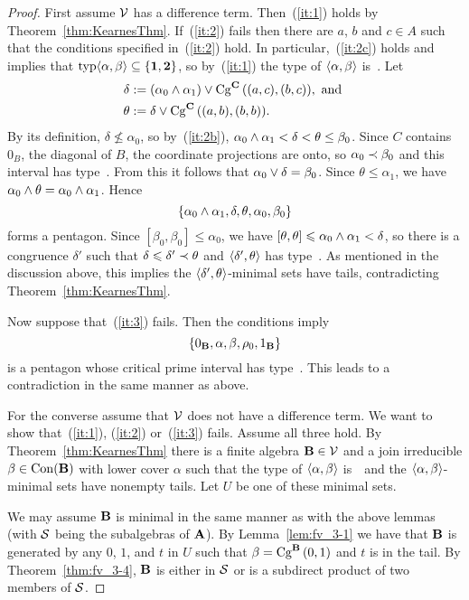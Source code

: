 \begin{proof}
First assume $\sV$ has a difference term.
Then~(\ref{it:1}) holds by Theorem~\ref{thm:KearnesThm}.
If~(\ref{it:2}) fails then there are $a$, $b$ and $c\in A$ such
that the conditions specified in~(\ref{it:2}) hold.
In particular,~(\ref{it:2c}) holds and implies that
$\typ\<\alpha, \beta\> \subseteq \{\utyp, \atyp\}$,
so by~(\ref{it:1}) the type of $\<\alpha, \beta\>$ is~\atyp.
Let
\begin{align*}
\delta &:= (\alpha_0 \meet \alpha_1) \join \Cga {(a,c)} {(b,c)} C,
            \text{ and }\\
\theta &:= \delta \join \Cga {(a,b)}{(b,b)} C.
\end{align*}
By its definition, $\delta \nleq \alpha_0$,
so by~(\ref{it:2b}), $\alpha_0\meet\alpha_1 < \delta < \theta \le \beta_0$.
Since $C$ contains $0_B$, the diagonal of $B$, the coordinate
projections are onto, so $\alpha_0 \cov \beta_0$ and this interval
has type~\atyp.
From this it follows that $\alpha_0 \join \delta = \beta_0$.
Since $\theta \le \alpha_1$, we have $\alpha_0 \meet \theta = \alpha_0\meet\alpha_1$.
Hence
\[
\{\alpha_0\meet\alpha_1, \delta, \theta, \alpha_0, \beta_0 \}
\]
forms a pentagon.
Since $[\beta_0,\beta_0] \leq \alpha_0$, we have
$[\theta,\theta] \leq \alpha_0\meet\alpha_1 < \delta$,
so there is a congruence $\delta'$ such that
$\delta\leq \delta' \cov \theta$ and $\<\delta', \theta\>$
has type~\atyp.
As mentioned in the discussion above, this implies the
$\la \delta',\theta\ra$-minimal sets have tails, contradicting
Theorem~\ref{thm:KearnesThm}.

Now suppose that~(\ref{it:3}) fails. Then the conditions imply
\[
\{0_{\alg B}, \alpha, \beta, \rho_0, 1_{\alg B} \}
\]
is a pentagon whose critical prime interval has type~\atyp. This
leads to a contradiction in the same manner as above.

For the converse assume that $\sV$ does not have a difference
term.
We want to show that~(\ref{it:1}), (\ref{it:2}) or~(\ref{it:3}) fails.
Assume all three hold.
By Theorem~\ref{thm:KearnesThm} there is a finite
algebra $\alg B \in \sV$ and a join irreducible
$\beta \in \op{Con}(\alg B)$ with lower cover
$\alpha$ such that the type of $\<\alpha, \beta\>$ is~\atyp\
and the $\la\alpha,\beta\ra$-minimal sets have
nonempty tails. Let $U$ be one of these minimal sets.


We may assume $\alg B$ is minimal in the same manner as with the
above lemmas (with $\sS$ being the subalgebras of $\alg A$).
By Lemma~\ref{lem:fv_3-1}
we have that $\alg B$ is generated by any $0$, $1$, and $t$ in
$U$ such
that $\beta = \Cga 01{B}$ and $t$ is in the tail. By
Theorem~\ref{thm:fv_3-4}, $\alg B$ is either
in $\sS$ or is a subdirect product of two members of $\sS$.


\end{proof}
